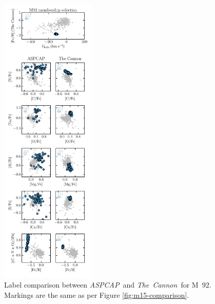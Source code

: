 \documentclass[12pt,preprint]{aastex}
\newcommand{\project}[1]{\textsl{#1}}
\newcommand{\TheCannon}{\project{The~Cannon}}
\newcommand{\acronym}[1]{{\small{#1}}}
\newcommand{\aspcap}{\project{\acronym{ASPCAP}}}
\begin{document}
\begin{figure}[p]
\centering
\includegraphics[width=0.4\textwidth]{M92_comparison.pdf}
\caption{Label comparison between \aspcap\ and \TheCannon\ for M~92.
Markings are the same as per Figure \ref{fig:m15-comparison}.
\label{fig:m92-comparison}}
\end{figure}
\end{document}
